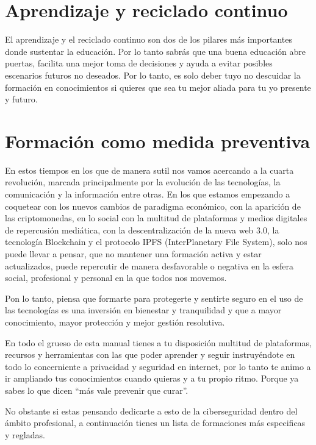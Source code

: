 \documentclass[
  spanish,
  a4paper,
  openany]{book}
\begin{document}
\hypertarget{aprendizaje-y-reciclado-continuo}{%
\section{Aprendizaje y reciclado continuo}\label{aprendizaje-y-reciclado-continuo}}

El aprendizaje y el reciclado continuo son dos de los pilares más importantes donde sustentar la educación. Por lo tanto sabrás que una buena educación abre puertas, facilita una mejor toma de decisiones y ayuda a evitar posibles escenarios futuros no deseados. Por lo tanto, es solo deber tuyo no descuidar la formación en conocimientos si quieres que sea tu mejor aliada para tu yo presente y futuro.

\hypertarget{formaciuxf3n-como-medida-preventiva}{%
\section{Formación como medida preventiva}\label{formaciuxf3n-como-medida-preventiva}}

En estos tiempos en los que de manera sutil nos vamos acercando a la cuarta revolución, marcada principalmente por la evolución de las tecnologías, la comunicación y la información entre otras. En los que estamos empezando a coquetear con los nuevos cambios de paradigma económico, con la aparición de las criptomonedas, en lo social con la multitud de plataformas y medios digitales de repercusión mediática, con la descentralización de la nueva web 3.0, la tecnología Blockchain y el protocolo IPFS (InterPlanetary File System), solo nos puede llevar a pensar, que no mantener una formación activa y estar actualizados, puede repercutir de manera desfavorable o negativa en la esfera social, profesional y personal en la que todos nos movemos.

Pon lo tanto, piensa que formarte para protegerte y sentirte seguro en el uso de las tecnologías es una inversión en bienestar y tranquilidad y que a mayor conocimiento, mayor protección y mejor gestión resolutiva.

En todo el grueso de esta manual tienes a tu disposición multitud de plataformas, recursos y herramientas con las que poder aprender y seguir instruyéndote en todo lo concerniente a privacidad y seguridad en internet, por lo tanto te animo a ir ampliando tus conocimientos cuando quieras y a tu propio ritmo. Porque ya sabes lo que dicen ``más vale prevenir que curar''.

No obstante si estas pensando dedicarte a esto de la ciberseguridad dentro del ámbito profesional, a continuación tienes un lista de formaciones más especificas y regladas.
\end{document}
